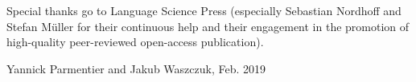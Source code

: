 \documentclass[output=paper]{langsci/langscibook}
\begin{document}
Special thanks go to Language Science Press (especially Sebastian
Nordhoff and Stefan M\"uller for their continuous help and their
engagement in the promotion of high-quality peer-reviewed open-access
publication).

\begin{flushright}
  Yannick Parmentier and Jakub Waszczuk, Feb. 2019
\end{flushright}


{\sloppy 
\printbibliography[heading=subbibliography,notkeyword=this]
}
\end{document}
